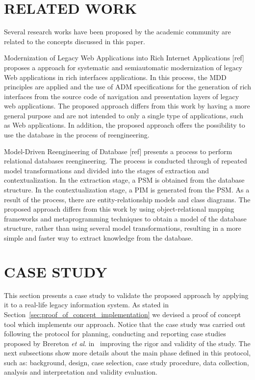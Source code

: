 \documentclass[a4paper,twoside]{article}
\begin{document}
\section{\uppercase{Related Work}}\label{sec:related_work}

Several research works have been proposed by the academic community are related to the concepts discussed in this paper.

Modernization of Legacy Web Applications into Rich Internet Applications [ref] proposes a approach for systematic and semiautomatic modernization of legacy Web applications in rich interfaces applications. In this process, the MDD principles are applied and the use of ADM specifications for the generation of rich interfaces from the source code of navigation and presentation layers of legacy web applications. The proposed approach differs from this work by having a more general purpose and are not intended to only a single type of applications, such as Web applications. In addition, the proposed approach offers the possibility to use the database in the process of reengineering.

Model-Driven Reengineering of Database [ref] presents a process to perform relational databases reengineering. The process is conducted through of repeated model transformations and divided into the stages of extraction and contextualization. In the extraction stage, a PSM is obtained from the database structure. In the contextualization stage, a PIM is generated from the PSM. As a result of the process, there are entity-relationship models and class diagrams. The proposed approach differs from this work by using object-relational mapping frameworks and metaprogramming techniques to obtain a model of the database structure, rather than using several model transformations, resulting in a more simple and faster way to extract knowledge from the database.


\section{\uppercase{Case Study}}

This section presents a case study to validate the proposed approach by applying it to a real-life legacy information system. As stated in Section~\ref{sec:proof_of_concept_implementation} we devised a proof of concept tool which implements our approach. Notice that the case study was carried out following the protocol for planning, conducting and reporting case studies proposed by Brereton \textit{et al}. in~\cite{case-study-template-2008} improving the rigor and validity of the study. The next subsections show more details about the main phase defined in this protocol, such as: background, design, case selection, case study procedure, data collection, analysis and interpretation and validity evaluation.
\end{document}
